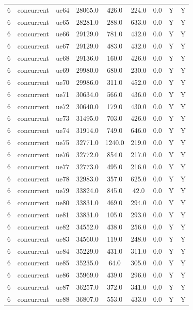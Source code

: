 \begin{table}[ht]
\begin{tabular}{|c|c|c|c|c|c|c|c|c|}
6 & concurrent & ue64 & 28065.0 & 426.0 & 224.0 & 0.0 & Y & Y \\
6 & concurrent & ue65 & 28281.0 & 288.0 & 633.0 & 0.0 & Y & Y \\
6 & concurrent & ue66 & 29129.0 & 781.0 & 432.0 & 0.0 & Y & Y \\
6 & concurrent & ue67 & 29129.0 & 483.0 & 432.0 & 0.0 & Y & Y \\
6 & concurrent & ue68 & 29136.0 & 160.0 & 426.0 & 0.0 & Y & Y \\
6 & concurrent & ue69 & 29980.0 & 680.0 & 230.0 & 0.0 & Y & Y \\
6 & concurrent & ue70 & 29986.0 & 311.0 & 452.0 & 0.0 & Y & Y \\
6 & concurrent & ue71 & 30634.0 & 566.0 & 436.0 & 0.0 & Y & Y \\
6 & concurrent & ue72 & 30640.0 & 179.0 & 430.0 & 0.0 & Y & Y \\
6 & concurrent & ue73 & 31495.0 & 703.0 & 426.0 & 0.0 & Y & Y \\
6 & concurrent & ue74 & 31914.0 & 749.0 & 646.0 & 0.0 & Y & Y \\
6 & concurrent & ue75 & 32771.0 & 1240.0 & 219.0 & 0.0 & Y & Y \\
6 & concurrent & ue76 & 32772.0 & 854.0 & 217.0 & 0.0 & Y & Y \\
6 & concurrent & ue77 & 32773.0 & 495.0 & 216.0 & 0.0 & Y & Y \\
6 & concurrent & ue78 & 32983.0 & 357.0 & 625.0 & 0.0 & Y & Y \\
6 & concurrent & ue79 & 33824.0 & 845.0 & 42.0 & 0.0 & Y & Y \\
6 & concurrent & ue80 & 33831.0 & 469.0 & 294.0 & 0.0 & Y & Y \\
6 & concurrent & ue81 & 33831.0 & 105.0 & 293.0 & 0.0 & Y & Y \\
6 & concurrent & ue82 & 34552.0 & 438.0 & 256.0 & 0.0 & Y & Y \\
6 & concurrent & ue83 & 34560.0 & 119.0 & 248.0 & 0.0 & Y & Y \\
6 & concurrent & ue84 & 35229.0 & 431.0 & 311.0 & 0.0 & Y & Y \\
6 & concurrent & ue85 & 35235.0 & 64.0 & 305.0 & 0.0 & Y & Y \\
6 & concurrent & ue86 & 35969.0 & 439.0 & 296.0 & 0.0 & Y & Y \\
6 & concurrent & ue87 & 36257.0 & 372.0 & 341.0 & 0.0 & Y & Y \\
6 & concurrent & ue88 & 36807.0 & 553.0 & 433.0 & 0.0 & Y & Y \\

\end{tabular}
\end{table}

